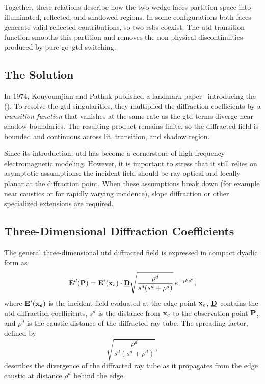 Together, these relations describe how the two wedge faces partition space into illuminated, reflected, and shadowed regions. In some configurations both faces generate valid reflected contributions, so two \glspl{rsb} coexist. The \gls{utd} transition function smooths this partition and removes the non-physical discontinuities produced by pure \gls{go}--\gls{gtd} switching.

\subsection{The  Solution}

In 1974, Kouyoumjian and Pathak published a landmark paper~ introducing the \emph{} (). To resolve the \gls{gtd} singularities, they multiplied the diffraction coefficients by a \emph{transition function} that vanishes at the same rate as the \gls{gtd} terms diverge near shadow boundaries. The resulting product remains finite, so the diffracted field is bounded and continuous across lit, transition, and \gls{shadow region}.

Since its introduction, \gls{utd} has become a cornerstone of high-frequency electromagnetic modeling. However, it is important to stress that it still relies on asymptotic assumptions: the incident field should be ray-optical and locally planar at the diffraction point. When these assumptions break down (for example near caustics or for rapidly varying incidence), slope diffraction or other specialized extensions are required.

\subsection{Three-Dimensional  Diffraction Coefficients}

The general three-dimensional \gls{utd} diffracted field is expressed in compact dyadic form as
\begin{equation}
  \mathbf{E}^d(\mathbf{P}) = \mathbf{E}^i(\mathbf{x}_e) \cdot \underline{\mathbf{D}} \sqrt{\frac{\rho^d}{s^d(s^d + \rho^d)}}\,e^{-jks^d},
\end{equation}
where $\mathbf{E}^i(\mathbf{x}_e)$ is the incident field evaluated at the edge point $\mathbf{x}_e$, $\underline{\mathbf{D}}$ contains the \gls{utd} diffraction coefficients, $s^d$ is the distance from $\mathbf{x}_e$ to the observation point $\mathbf{P}$, and $\rho^d$ is the caustic distance of the diffracted ray tube. The spreading factor, defined by
\begin{equation}
  \sqrt{\frac{\rho^d}{s^d(s^d+\rho^d)}},
\end{equation}
describes the divergence of the diffracted ray tube as it propagates from the edge caustic at distance $\rho^d$ behind the edge.

